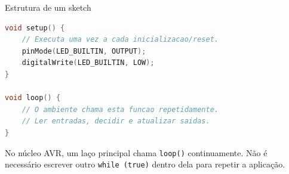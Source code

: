 \begin{frame}[fragile,t]{Estrutura de um sketch}
\begin{lstlisting}[language=C++]
void setup() {
    // Executa uma vez a cada inicializacao/reset.
    pinMode(LED_BUILTIN, OUTPUT);
    digitalWrite(LED_BUILTIN, LOW);
}

void loop() {
    // O ambiente chama esta funcao repetidamente.
    // Ler entradas, decidir e atualizar saidas.
}
\end{lstlisting}
\small No núcleo AVR, um laço principal chama \texttt{loop()} continuamente. Não é necessário escrever outro \texttt{while (true)} dentro dela para repetir a aplicação.
\end{frame}
